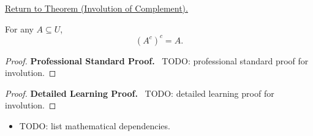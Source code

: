 \newpage
{}
\label{prf:involution}

\begin{remark*}[Return]
\hyperref[thm:involution]{Return to Theorem (Involution of Complement).}
\end{remark*}

\begin{theorem*}
For any $A \subseteq U$,
\[
(A^c)^c = A.
\]
\end{theorem*}

\begin{proof}
\textbf{Professional Standard Proof.}~
TODO: professional standard proof for involution.
\end{proof}

\begin{proof}
\textbf{Detailed Learning Proof.}~
TODO: detailed learning proof for involution.
\end{proof}

\begin{remark*}
\end{remark*}

\begin{dependencies}
\begin{itemize}
  \item TODO: list mathematical dependencies.
\end{itemize}
\end{dependencies}

\clearpage
